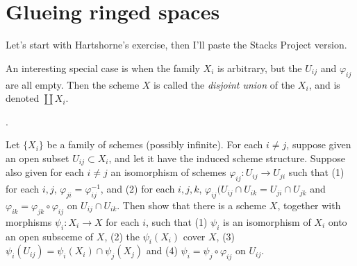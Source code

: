 \section{Glueing ringed spaces}
\label{section-glueing-ringed-spaces}

\noindent
Let's start with Hartshorne's exercise,
then I'll paste the Stacks Project version.

An interesting special case is when the
family $X_i$ is arbitrary, but the $U_{ij}$
and $\varphi_{ij}$ are all empty.
Then the scheme $X$ is called the
{\it disjoint union} of the $X_i$,
and is denoted $\coprod X_i$.

\begin{exercise}
\label{exercise-gluing-schemes}
\begin{reference}
\cite[Exercise II.2.12]{hart}.
\end{reference}
Let $\{X_i\}$ be a family of schemes
(possibly infinite).
For each $i \neq j$,
suppose given an open subset $U_{ij}
\subset X_i$,
and let it have the induced scheme
structure. Suppose also given for each
$i \neq j$ an isomorphism of schemes
$\varphi_{ij}:U_{ij}\to U_{ji}$
such that (1) for each $i,j$,
$\varphi_{ji}=\varphi_{ij}^{-1}$,
and (2) for each $i,j,k$,
$\varphi_{ij}(U_{ij}\cap U_{ik}
=U_{ji}\cap U_{jk}$ and
$\varphi_{ik}= \varphi_{jk}\circ \varphi_{ij}$
on $U_{ij}\cap U_{ik}$.
Then show that there is a scheme $X$,
together with morphisms
$\psi_i:X_i \to X$ for each $i$,
such that (1) $\psi_i$ is an isomorphism
of $X_i$ onto an open subsceme of $X$,
(2) the $\psi_i(X_i)$ cover $X$,
(3) $\psi_i(U_{ij}) = \psi_i(X_i)
\cap\psi_j(X_j)$ and
(4) $\psi_i = \psi_j \circ \varphi_{ij}$
on $U_{ij}$.
\end{exercise}

